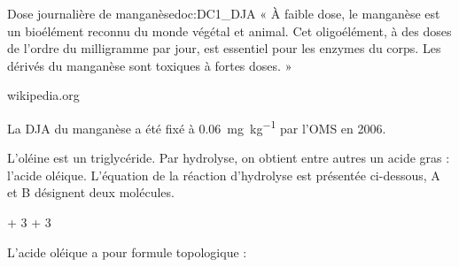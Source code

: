 \begin{doc}{Dose journalière de manganèse}{doc:DC1_DJA}
  « À faible dose, le manganèse est un bioélément reconnu du monde végétal et animal.
  Cet oligoélément, à des doses de l'ordre du milligramme par jour, est essentiel pour les enzymes du corps.
  Les dérivés du manganèse sont toxiques à fortes doses. »

  \begin{flushright}
    wikipedia.org
  \end{flushright}

  La DJA du manganèse a été fixé à \qty{0,06}{\mg\per\kg} par l'OMS en 2006.
\end{doc}


\newpage
L'oléine est un triglycéride.
Par hydrolyse, on obtient entre autres un acide gras : l'acide oléique.
L'équation de la réaction d'hydrolyse est présentée ci-dessous, A et B désignent deux molécules.
\begin{center}  
  + 3 \reaction {} 
  + 3 
\end{center}
  



\medskip
L'acide oléique a pour formule topologique :
\begin{center}
\end{center}

